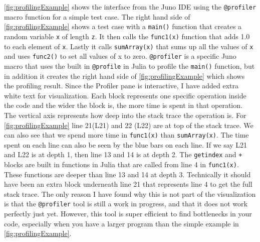 \autoref{fig:profilingExample} shows the interface from the Juno IDE using the \texttt{@profiler} macro function \emph{\citep{JunoProfilerMacro}} for a simple test case. The right hand side of \autoref{fig:profilingExample} shows a test case with a \texttt{main()} function that creates a random variable \texttt{x} of length \texttt{z}. It then  calls the \texttt{func1(x)} function that adds 1.0 to each element of \texttt{x}. Lastly it calls \texttt{sumArray(x)} that sums up all the values of \texttt{x} and uses \texttt{func2()} to set all values of x to zero. \texttt{@profiler} is a specific Juno macro that uses the built in \texttt{@profile} in Julia \emph{\citep{Profile.jl}} to profile the \texttt{main()} function, but in addition it creates the right hand side of \autoref{fig:profilingExample} which shows the profiling result. Since the Profiler pane is interactive, I have added extra white text for visualization. Each block represents one specific operation inside the code and the wider the block is, the more time is spent in that operation. The vertical axis represents how deep into the stack trace the operation is. For \autoref{fig:profilingExample} line 21(L21) and 22 (L22) are at top of the stack trace. We can also see that we spend more time in \texttt{func1(x)} than \texttt{sumArray(x)}. The time spent on each line can also be seen by the blue bars on each line. If we say  L21 and L22 is at depth 1, then line 13 and 14 is at depth 2. The \texttt{getindex} and \texttt{+} blocks are built in functions in Julia that are called from line 4 in \texttt{func1(x)}. These functions are deeper than line 13 and 14 at depth 3. Technically it should have been an extra block underneath line 21 that represents line 4 to get the full stack trace. The only reason I have found why this is not part of the visualization is that the \texttt{@profiler} tool is still a work in progress, and that it does not work perfectly just yet. However, this tool is super efficient to find bottlenecks in your code, especially when you have a larger program than the simple example in \autoref{fig:profilingExample}. 
